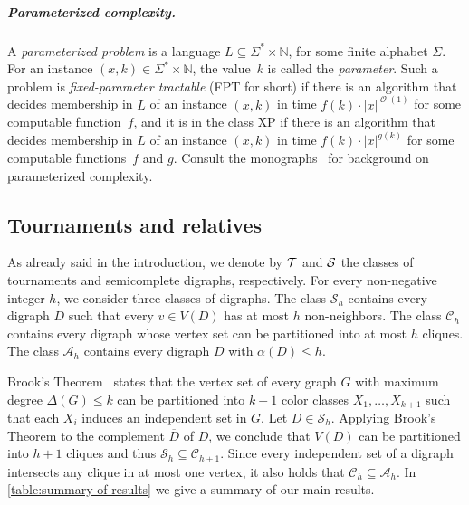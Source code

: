 \documentclass[a4paper,UKenglish,cleveref, autoref, thm-restate]{lipics-v2021}
\DeclareMathOperator{\Ocal}{\mathcal{O}\xspace}
\renewcommand{\FPT}{{\sf FPT}\xspace}
\renewcommand{\XP}{{\sf XP}\xspace}
\begin{document}
\subparagraph*{Parameterized complexity.}  A \emph{parameterized problem} is a language $L \subseteq \Sigma^* \times \mathbb{N}$, for some finite alphabet $\Sigma$.  For an instance $(x,k) \in \Sigma^* \times \mathbb{N}$, the value~$k$ is called the \emph{parameter}. Such a problem is \emph{fixed-parameter tractable} (\FPT for short) if there is an algorithm that decides membership in $L$ of an instance $(x, k)$ in time $f(k)\cdot {|x|}^{\Ocal(1)}$ for some computable function~$f$, and it is in the class \XP if there is an algorithm that decides membership in $L$ of an instance $(x, k)$ in time $f(k)\cdot {|x|}^{g(k)}$ for some computable functions~$f$ and $g$. Consult the monographs~\cite{CyganFKLMPPS15,Niedermeier06,FlumG06,DoFe13,FominLSZ19} for background on parameterized complexity.



\subsection{Tournaments and relatives}
\label{sec:tournaments-relatives}


As already said in the introduction, we denote by ${\cal T}$ and ${\cal S}$ the classes of tournaments and semicomplete digraphs, respectively.  For every non-negative integer $h$, we consider three classes of digraphs.
The class $\mathcal{S}_h$ contains every digraph $D$ such that every $v \in V(D)$ has at
most $h$ non-neighbors.
The class $\mathcal{C}_h$ contains every digraph whose vertex set can be partitioned into
at most $h$ cliques.
The class $\mathcal{A}_h$ contains every digraph $D$ with $\alpha(D) \leq h$.

Brook's Theorem~\cite{Brooks_1941} states that the vertex set of every graph $G$ with
maximum degree $\Delta(G) \leq k$ can be partitioned into $k + 1$ color classes $X_1,
\ldots, X_{k+1}$ such that each $X_i$ induces an independent set in $G$.
Let $D \in \mathcal{S}_h$.
Applying Brook's Theorem to the complement $\overline{D}$ of $D$, we conclude that $V(D)$
can be partitioned into $h+1$ cliques and thus $\mathcal{S}_h \subseteq \mathcal{C}_{h+1}$.
Since every independent set of a digraph intersects any clique in at most one vertex, it
also holds that $\mathcal{C}_h \subseteq \mathcal{A}_{h}$.
In \autoref{table:summary-of-results} we give a summary of our main results.
\end{document}
